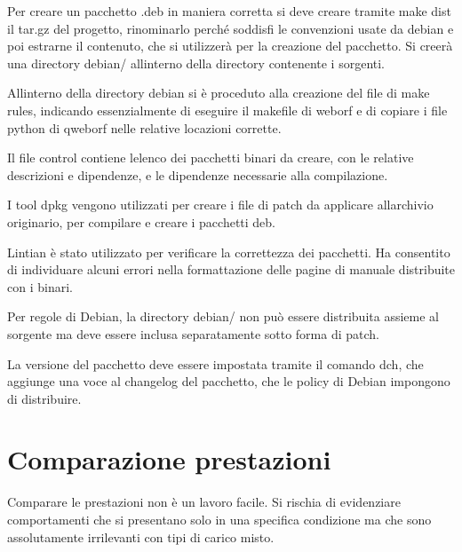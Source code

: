 \documentclass[a4paper,11pt]{article}
\begin{document}
{\sffamily
Per creare un pacchetto .deb in maniera corretta si deve creare tramite
{\textquotedbl}make dist{\textquotedbl} il tar.gz del progetto,
rinominarlo perch\'e soddisfi le convenzioni usate da debian e poi
estrarne il contenuto, che si utilizzer\`a per la creazione del
pacchetto. Si creer\`a una directory
{\textquotedbl}debian/{\textquotedbl} all{\textquotesingle}interno
della directory contenente i sorgenti.}


\bigskip

{\sffamily
All{\textquotesingle}interno della directory debian si \`e proceduto
alla creazione del file di make {\textquotedbl}rules{\textquotedbl},
indicando essenzialmente di eseguire il makefile di weborf e di copiare
i file python di qweborf nelle relative locazioni corrette.}

{\sffamily
Il file control contiene l{\textquotesingle}elenco dei pacchetti binari
da creare, con le relative descrizioni e dipendenze, e le dipendenze
necessarie alla compilazione.}


\bigskip

{\sffamily
I tool dpkg vengono utilizzati per creare i file di patch da applicare
all{\textquotesingle}archivio originario, per compilare e creare i
pacchetti deb.}

{\sffamily
Lintian \`e stato utilizzato per verificare la correttezza dei
pacchetti. Ha consentito di individuare alcuni errori nella
formattazione delle pagine di manuale distribuite con i binari.}


\bigskip

{\sffamily
Per regole di Debian, la directory debian/ non pu\`o essere distribuita
assieme al sorgente ma deve essere inclusa separatamente sotto forma di
patch.}


\bigskip

{\sffamily
La versione del pacchetto deve essere impostata tramite il comando
{\textquotedbl}dch{\textquotedbl}, che aggiunge una voce al changelog
del pacchetto, che le policy di Debian impongono di distribuire.}


\bigskip

\section[Comparazione prestazioni]{Comparazione prestazioni}
{\sffamily
Comparare le prestazioni non \`e un lavoro facile. Si rischia di
evidenziare comportamenti che si presentano solo in una specifica
condizione ma che sono assolutamente irrilevanti con tipi di carico
misto.}
\end{document}
